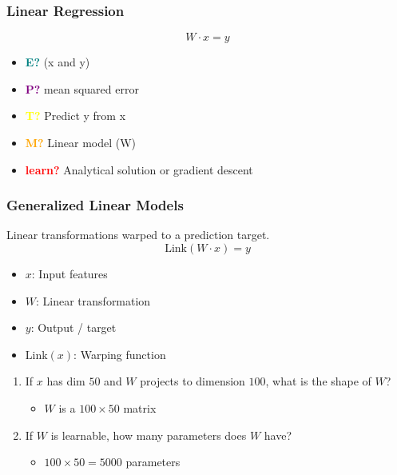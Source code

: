 \subsubsection{Linear Regression}
\begin{definition} 
    \begin{equation}
        W \cdot x = y
    \end{equation}
    \begin{itemize}
        \item \textcolor{teal}{\textbf{E?}} (x and y)
        \item \textcolor{purple}{\textbf{P?}} mean squared error
        \item \textcolor{yellow}{\textbf{T?}} Predict y from x
        \item \textcolor{orange}{\textbf{M?}} Linear model (W)
        \item \textcolor{red}{\textbf{learn?}} Analytical solution or gradient descent
    \end{itemize}
\end{definition}

\subsubsection{Generalized Linear Models}
\begin{definition} 
    Linear transformations warped to a prediction target.
    \begin{equation}
        \text{Link}(W \cdot x) = y
    \end{equation}
    \begin{itemize}
        \item $x$: Input features
        \item $W$: Linear transformation
        \item $y$: Output / target
        \item $\text{Link}(x)$: Warping function
    \end{itemize}
\end{definition}

\begin{example}
    \begin{enumerate}
        \item If $x$ has dim $50$ and $W$ projects to dimension $100$, what is the shape of $W$?
        \begin{itemize}
            \item $W$ is a $100 \times 50$ matrix
        \end{itemize}
        \item If $W$ is learnable, how many parameters does $W$ have?
        \begin{itemize}
            \item $100 \times 50 = 5000$ parameters
        \end{itemize}
    \end{enumerate}
\end{example}


